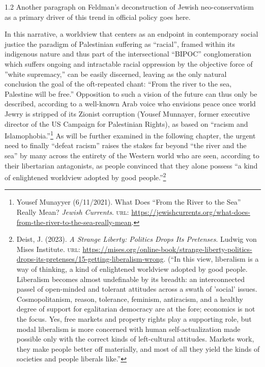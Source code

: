 \documentclass[../unravbook.tex]{subfiles}
\begin{document}
\begin{spacing}{1.2}
Another paragraph on Feldman's deconstruction of Jewish neo-conservatism as a primary driver of this trend in official policy goes here.

In this narrative, a worldview that centers as an endpoint in contemporary social justice the paradigm of Palestinian suffering as ``racial'', framed within its indigenous nature and thus part of the intersectional ``BIPOC'' conglomeration which suffers ongoing and intractable racial oppression by the objective force of ''white supremacy,'' can be easily discerned, leaving as the only natural conclusion the goal of the oft-repeated chant: ``From the river to the sea, Palestine will be free.'' Opposition to such a vision of the future can thus only be described, according to a well-known Arab voice who envisions peace once world Jewry is stripped of its Zionist corruption (Yousef Munnayer, former executive director of the US Campaign for Palestinian Rights), as based on ``racism and Islamophobia.''\footnote{Yousef Munayyer (6/11/2021). What Does ``From the River to the Sea'' Really Mean? \textit{Jewish Currents}. \textsc{url: } \url{https://jewishcurrents.org/what-does-from-the-river-to-the-sea-really-mean}.} As will be further examined in the following chapter, the urgent need to finally ``defeat racism'' raises the stakes far beyond ``the river and the sea'' by many across the entirety of the Western world who are seen, according to their libertarian antagonists, as people convinced that they alone possess ``a kind of enlightened worldview adopted by good people.''\footnote{Deist, J. (2023). \textit{A Strange Liberty: Politics Drops Its Pretenses}. Ludwig von Mises Institute. \textsc{url: } \url{https://mises.org/online-book/strange-liberty-politics-drops-its-pretenses/15-getting-liberalism-wrong}. (``In this view, liberalism is a way of thinking, a kind of enlightened worldview adopted by good people. Liberalism becomes almost undefinable by its breadth: an interconnected passel of open-minded and tolerant attitudes across a swath of 'social' issues. Cosmopolitanism, reason, tolerance, feminism, antiracism, and a healthy degree of support for egalitarian democracy are at the fore; economics is not the focus. Yes, free markets and property rights play a supporting role, but modal liberalism is more concerned with human self-actualization made possible only with the correct kinds of left-cultural attitudes. Markets work, they make people better off materially, and most of all they yield the kinds of societies and people liberals like.''}

\parindent 0pt
\parskip 6pt

\end{spacing}

{\footnotesize
\printendnotes[paragraph]}

\thispagestyle{empty} %
\end{document}
